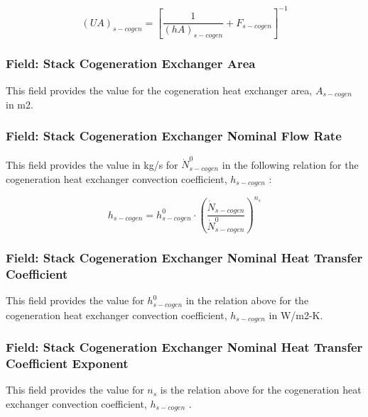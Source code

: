 \begin{equation}
{\left( {UA} \right)_{s - cogen}} = {\left[ {\frac{1}{{{{\left( {hA} \right)}_{s - cogen}}}} + {F_{s - cogen}}} \right]^{ - 1}}
\end{equation}

\subsubsection{Field: Stack Cogeneration Exchanger Area}\label{field-stack-cogeneration-exchanger-area}

This field provides the value for the cogeneration heat exchanger area, \({A_{s - cogen}}\) in m2.

\subsubsection{Field: Stack Cogeneration Exchanger Nominal Flow Rate}\label{field-stack-cogeneration-exchanger-nominal-flow-rate}

This field provides the value in kg/s for \(\dot N_{s - cogen}^0\) in the following relation for the cogeneration heat exchanger convection coefficient, \({h_{s - cogen}}\) :

\begin{equation}
{h_{s - cogen}} = h_{s - cogen}^0 \cdot {\left( {\frac{{{{\dot N}_{s - cogen}}}}{{\dot N_{s - cogen}^0}}} \right)^{{n_s}}}
\end{equation}

\subsubsection{Field: Stack Cogeneration Exchanger Nominal Heat Transfer Coefficient}\label{field-stack-cogeneration-exchanger-nominal-heat-transfer-coefficient}

This field provides the value for \(h_{s - cogen}^0\) in the relation above for the cogeneration heat exchanger convection coefficient, \({h_{s - cogen}}\) in W/m2-K.

\subsubsection{Field: Stack Cogeneration Exchanger Nominal Heat Transfer Coefficient Exponent}\label{field-stack-cogeneration-exchanger-nominal-heat-transfer-coefficient-exponent}

This field provides the value for \({n_s}\) is the relation above for the cogeneration heat exchanger convection coefficient, \({h_{s - cogen}}\) .

